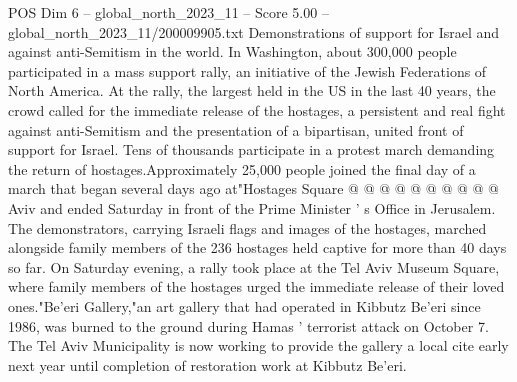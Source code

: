 \begin{textsample}{POS Dim 6 – global\_north\_2023\_11 – Score 5.00 – global\_north\_2023\_11/200009905.txt}
Demonstrations of support for Israel and against anti-Semitism in the world.
In Washington, about 300,000 people participated in a mass support rally, an initiative of the Jewish Federations of North America.
At the rally, the largest held in the US in the last 40 years, the crowd called for the immediate release of the hostages, a persistent and real fight against anti-Semitism and the presentation of a bipartisan, united front of support for Israel.
Tens of thousands participate in a protest march demanding the return of hostages.Approximately 25,000 people joined the final day of a march that began several days ago at"Hostages Square @ @ @ @ @ @ @ @ @ @ Aviv and ended Saturday in front of the Prime Minister ' s Office in Jerusalem.
The demonstrators, carrying Israeli flags and images of the hostages, marched alongside family members of the 236 hostages held captive for more than 40 days so far.
On Saturday evening, a rally took place at the Tel Aviv Museum Square, where family members of the hostages urged the immediate release of their loved ones."Be'eri Gallery,"an art gallery that had operated in Kibbutz Be'eri since 1986, was burned to the ground during Hamas ' terrorist attack on October 7.
The Tel Aviv Municipality is now working to provide the gallery a local cite early next year until completion of restoration work at Kibbutz Be'eri.

\end{textsample}
